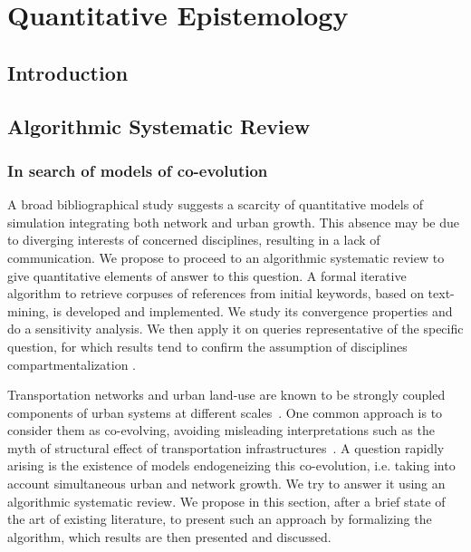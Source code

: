 


\chapter{Quantitative Epistemology} %

\label{ch:quantepistemo} %



\section{Introduction}




\section{Algorithmic Systematic Review}


\subsection{In search of models of co-evolution}


A broad bibliographical study suggests a scarcity of quantitative models of simulation integrating both network and urban growth. This absence may be due to diverging interests of concerned disciplines, resulting in a lack of communication.  We propose to proceed to an algorithmic systematic review to give quantitative elements of answer to this question. A formal iterative algorithm to retrieve corpuses of references from initial keywords, based on text-mining, is developed and implemented. We study its convergence properties and do a sensitivity analysis. We then apply it on queries representative of the specific question, for which results tend to confirm the assumption of disciplines compartmentalization .

Transportation networks and urban land-use are known to be strongly coupled components of urban systems at different scales~\cite{bretagnolle2009organization}. One common approach is to consider them as co-evolving, avoiding misleading interpretations such as the myth of structural effect of transportation infrastructures~\cite{offner1993effets}. A question rapidly arising is the existence of models endogeneizing this co-evolution, i.e. taking into account simultaneous urban and network growth. We try to answer it using an algorithmic systematic review. We propose in this section, after a brief state of the art of existing literature, to present such an approach by formalizing the algorithm, which results are then presented and discussed. 

